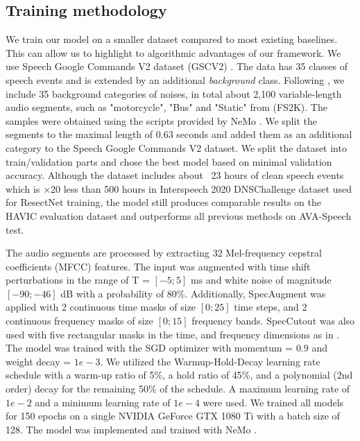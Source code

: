 \documentclass{article}
\begin{document}
\subsection{Training methodology}
We train our model on a smaller dataset compared to most existing baselines. This can allow us to highlight to algorithmic advantages of our framework. We use Speech Google Commands V2 dataset (GSCV2) \cite{warden2018speech}. The data has 35 classes of speech events and is extended by an additional \textit{background} class. Following \cite{jia2021marblenet}, we include 35 background categories of noises, in total about 2,100 variable-length audio segments, such as "motorcycle", "Bus" and "Static" from \cite{font2013freesound} (FS2K). The samples were obtained using the scripts provided by NeMo \cite{kuchaiev2019nemo}. We split the segments to the maximal length of 0.63 seconds and added them as an additional category to the Speech Google Commands V2 dataset. 
We split the dataset into train/validation parts and chose the best model based on minimal validation accuracy.
Although the dataset includes about ~23 hours of clean speech events which is $\times$20 less than 500 hours in Interspeech 2020 DNSChallenge dataset \cite{reddy2020interspeech} used for ResectNet \cite{kopuklu2022resectnet} training, the model still produces comparable results on the HAVIC evaluation dataset and outperforms all previous methods on AVA-Speech test.

The audio segments are processed by extracting 32 Mel-frequency cepstral coefficients (MFCC) features. The input was augmented with time shift perturbations in the range of T = $[-5; 5]$ ms and white noise of magnitude $[-90;-46]$ dB with a probability of $80\%$. Additionally, SpecAugment \cite{park2019specaugment} was applied with 2 continuous time masks of size $[0; 25]$ time steps, and 2 continuous frequency masks of size $[0; 15]$
frequency bands. SpecCutout \cite{devries2017improved} was also used with five rectangular masks in the time, and frequency dimensions as in \cite{jia2021marblenet}. The model was trained with the SGD optimizer with momentum = $0.9$ and weight decay = $1e-3$. We utilized the Warmup-Hold-Decay learning rate schedule \cite{he2019bag} with a warm-up ratio of 5\%, a hold ratio of 45\%, and a polynomial (2nd order) decay for the remaining 50\% of the schedule. A maximum 
learning rate of $1e-2$ and a minimum learning rate of $1e-4$ were used. We trained all models for 150 epochs on a single NVIDIA GeForce GTX 1080 Ti with a batch size of 128. The model was implemented and trained with NeMo \cite{kuchaiev2019nemo}. 
\end{document}
